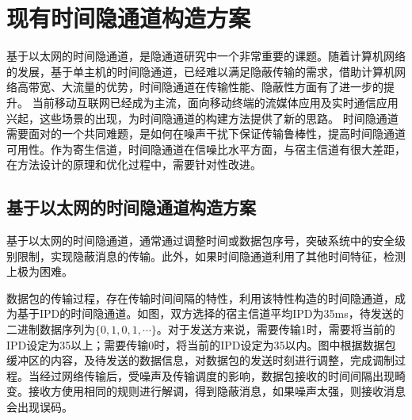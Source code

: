\section{现有时间隐通道构造方案}
\label{chap:backinfo:ctc}

基于以太网的时间隐通道，是隐通道研究中一个非常重要的课题。随着计算机网络的发展，基于单主机的时间隐通道，已经难以满足隐蔽传输的需求，借助计算机网络高带宽、大流量的优势，时间隐通道在传输性能、隐蔽性方面有了进一步的提升。
当前移动互联网已经成为主流，面向移动终端的流媒体应用及实时通信应用兴起，这些场景的出现，为时间隐通道的构建方法提供了新的思路。
时间隐通道需要面对的一个共同难题，是如何在噪声干扰下保证传输鲁棒性，提高时间隐通道可用性。作为寄生信道，时间隐通道在信噪比水平方面，与宿主信道有很大差距，在方法设计的原理和优化过程中，需要针对性改进。

\subsection{基于以太网的时间隐通道构造方案}
\label{chap:backinfo:ctc:ethernet}
基于以太网的时间隐通道，通常通过调整时间或数据包序号，突破系统中的安全级别限制，实现隐蔽消息的传输。此外，如果时间隐通道利用了其他时间特征，检测上极为困难。


数据包的传输过程，存在传输时间间隔的特性，利用该特性构造的时间隐通道，成为基于IPD的时间隐通道。如图，双方选择的宿主信道平均IPD为35ms，待发送的二进制数据序列为$\{0, 1, 0, 1, \cdots\}$。对于发送方来说，需要传输1时，需要将当前的IPD设定为35以上；需要传输0时，将当前的IPD设定为35以内。图中根据数据包缓冲区的内容，及待发送的数据信息，对数据包的发送时刻进行调整，完成调制过程。当经过网络传输后，受噪声及传输调度的影响，数据包接收的时间间隔出现畸变。接收方使用相同的规则进行解调，得到隐蔽消息，如果噪声太强，则接收消息会出现误码。

